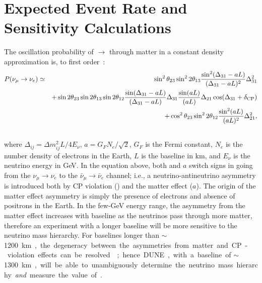\section{Expected Event Rate and Sensitivity Calculations}
\label{sec:physics-lbnosc-senscalc}

The oscillation probability of \numu $\rightarrow$ \nue through matter in a constant density
approximation is,  %
to first order~\cite{Nunokawa:2007qh}:
%
\begin{eqnarray}
P(\nu_\mu \rightarrow \nu_e) & \simeq & \sin^2 \theta_{23} \sin^2 2 \theta_{13} 
\frac{ \sin^2(\Delta_{31} - aL)}{(\Delta_{31}-aL)^2} \Delta_{31}^2\\ \nonumber
& & + \sin 2 \theta_{23} \sin 2 \theta_{13} \sin 2 \theta_{12} \frac{ \sin(\Delta_{31} - aL)}{(\Delta_{31}-aL)} \Delta_{31} \frac{\sin(aL)}{(aL)} \Delta_{21} \cos (\Delta_{31} + \mdeltacp)\\ \nonumber
& & + \cos^2 \theta_{23} \sin^2 2 \theta_{12} \frac {\sin^2(aL)}{(aL)^2} \Delta_{21}^2, \\ \nonumber
\label{eqn:appprob}
\end{eqnarray}
where $\Delta_{ij} = \Delta m^2_{ij} L/4E_\nu$, $a = G_FN_e/\sqrt{2}$, $G_F$ is the Fermi constant, $N_e$ is the number density of electrons in the Earth, $L$ is the baseline in km, and $E_\nu$ is the neutrino energy in GeV. 
In the equation above, both \deltacp and $a$ 
switch signs in going from the
$\nu_\mu \to \nu_e$ to the $\bar{\nu}_\mu \to \bar{\nu}_e$ channel; i.e.,
a neutrino-antineutrino asymmetry is introduced both by CP violation (\deltacp)
and the matter effect ($a$). The origin of the matter effect asymmetry 
is simply the presence of electrons and absence of positrons in the Earth.  
In the few-GeV energy range, the asymmetry from the matter effect increases with baseline as the neutrinos
pass through more matter, therefore an experiment with a longer baseline will be
more sensitive to the neutrino mass hierarchy. For baselines longer than 
$\sim$\SI{1200}\km, the degeneracy between the asymmetries from matter
and CP-violation effects can be resolved~\cite{Bass:2013vcg}; hence DUNE, with a baseline of $\sim$\SI{1300}\km, 
will be able to unambiguously
determine the neutrino mass hierarchy \textit{and} measure the value of \deltacp. %

